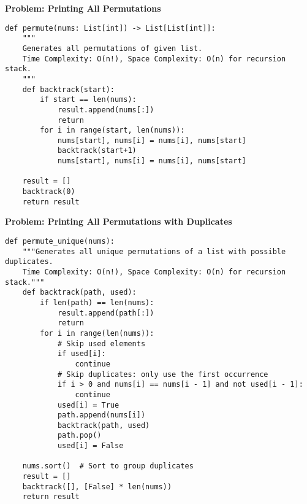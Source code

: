 \noindent\textbf{Problem: Printing All Permutations}
\begin{verbatim}
def permute(nums: List[int]) -> List[List[int]]:
    """
    Generates all permutations of given list.
    Time Complexity: O(n!), Space Complexity: O(n) for recursion stack.
    """
    def backtrack(start):
        if start == len(nums):
            result.append(nums[:])
            return
        for i in range(start, len(nums)):
            nums[start], nums[i] = nums[i], nums[start]
            backtrack(start+1)
            nums[start], nums[i] = nums[i], nums[start]
            
    result = []
    backtrack(0)
    return result
\end{verbatim}
\noindent\textbf{Problem: Printing All Permutations with Duplicates}
\begin{verbatim}
def permute_unique(nums):
    """Generates all unique permutations of a list with possible duplicates.
    Time Complexity: O(n!), Space Complexity: O(n) for recursion stack."""
    def backtrack(path, used):
        if len(path) == len(nums):
            result.append(path[:])
            return
        for i in range(len(nums)):
            # Skip used elements
            if used[i]:
                continue
            # Skip duplicates: only use the first occurrence
            if i > 0 and nums[i] == nums[i - 1] and not used[i - 1]:
                continue
            used[i] = True
            path.append(nums[i])
            backtrack(path, used)
            path.pop()
            used[i] = False

    nums.sort()  # Sort to group duplicates
    result = []
    backtrack([], [False] * len(nums))
    return result
\end{verbatim}
% 
